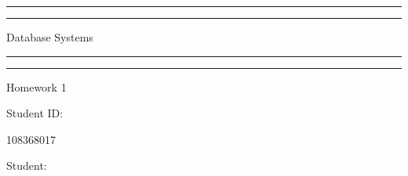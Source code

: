\begin{titlepage} %

	\centering %
	
	\scshape %
	
	\vspace*{\baselineskip} %
	
	
	\rule{\textwidth}{1.6pt}\vspace*{-\baselineskip}\vspace*{2pt} %
	\rule{\textwidth}{0.4pt} %
	
	\vspace{0.75\baselineskip} %
	
	{\LARGE Database Systems} %
	
	\vspace{0.75\baselineskip} %
	
	\rule{\textwidth}{0.4pt}\vspace*{-\baselineskip}\vspace{3.2pt} %
	\rule{\textwidth}{1.6pt} %
	
	\vspace{2\baselineskip} %
	
	
	Homework 1 %
	
	\vspace*{3\baselineskip} %
	
	
	Student ID:

	\vspace{0.5\baselineskip}

	{\scshape 108368017}

	\vspace{0.5\baselineskip}

	Student: 
	
	\vspace{0.5\baselineskip} %


\end{titlepage}
